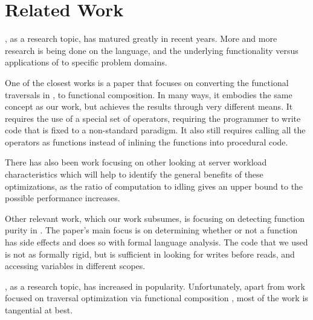 \chapter{Related Work}

\javascript, as a research topic, has matured greatly in recent years.  More and more research is being done on \javascript the language, and the underlying functionality versus applications of \javascript to specific problem domains.

One of the closest works is a paper that focuses on converting the functional traversals in \javascript \cite{combinators15}, to functional composition.  In many ways, it embodies the same concept as our work, but achieves the results through very different means.  It requires the use of a special set of operators, requiring the programmer to write code that is fixed to a non-standard paradigm. It also still requires calling all the operators as functions instead of inlining the functions into procedural code.

There has also been work focusing on other looking at server workload characteristics \cite{workload14} which will help to identify the general benefits of these optimizations, as the ratio of computation to idling gives an upper bound to the possible performance increases.

Other relevant work, which our work subsumes, is focusing on detecting function purity in \javascript \cite{purity15}.  The paper's main focus is on determining whether or not a function has side effects and does so with formal language analysis.  The code that we used is not as formally rigid, but is sufficient in looking for writes before reads, and accessing variables in different scopes.  

\javascript, as a research topic, has increased in popularity. Unfortunately, apart from work focused on traversal optimization via functional composition \cite{combinators15}, most of the work is tangential at best.
